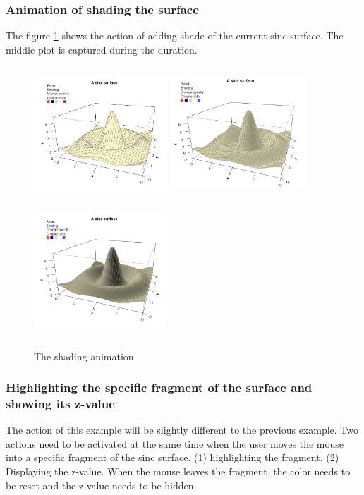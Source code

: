\documentclass[11pt,twoside]{report}
\begin{document}
\newpage
\subsubsection*{Animation of shading the surface}
The figure \ref{Example_6.3.3} shows the action of adding shade of the current sinc surface. The middle plot is captured during the duration.
\begin{figure}[h]
	\begin{center}
		\includegraphics[height = 5cm, width = 5cm]{figure/svg/origin_1.PNG}
		\includegraphics[height = 5cm, width = 5cm]{figure/svg/Shade_2_2.PNG}
		\includegraphics[height = 5cm, width = 5cm]{figure/svg/Shade_3.PNG}
		\caption{The shading animation}
		\label{Example_6.3.3}
	\end{center}
\end{figure}

\subsubsection*{Highlighting the specific fragment of the surface and showing its z-value}
The action of this example will be slightly different to the previous example. Two actions need to be activated at the same time when the user moves the mouse into a specific fragment of the sinc surface. (1) highlighting the fragment. (2) Displaying the z-value. When the mouse leaves the fragment, the color needs to be reset and the z-value needs to be hidden.\\
\end{document}
